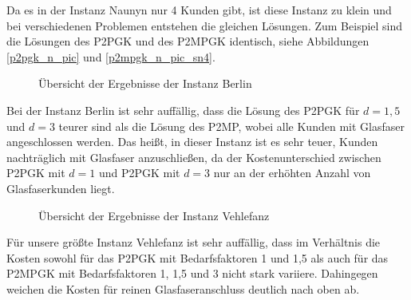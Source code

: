 \documentclass[11pt,a4paper]{article}
\theoremstyle{my_th_style1}
\begin{document}
 Da es in der Instanz Naunyn nur 4 Kunden gibt, ist diese Instanz zu klein und bei verschiedenen Problemen entstehen die gleichen Lösungen. Zum Beispiel sind die Lösungen des P2PGK und des P2MPGK identisch, siehe Abbildungen \eqref{p2pgk_n_pic} und \eqref{p2mpgk_n_pic_sn4}.
 
 \begin{figure}[!htbp]
 	\centering
 	\caption{\"Ubersicht der Ergebnisse der Instanz Berlin}
 \end{figure}
 
 Bei der Instanz Berlin ist sehr auffällig, dass die Lösung des P2PGK für $d=1,5$ und $d=3$ teurer sind als die Lösung des P2MP, wobei alle Kunden mit Glasfaser angeschlossen werden. Das heißt, in dieser Instanz ist es sehr teuer, Kunden nachträglich mit Glasfaser anzuschließen, da der Kostenunterschied zwischen P2PGK mit $d=1$ und P2PGK mit $d=3$ nur an der erhöhten Anzahl von Glasfaserkunden liegt. 
 
 
  \begin{figure}[!htbp]
  	\centering
 	\caption{\"Ubersicht der Ergebnisse der Instanz Vehlefanz}
 \end{figure}
F\"ur unsere gr\"oßte Instanz Vehlefanz ist sehr auff\"allig, dass im Verhältnis die Kosten sowohl f\"ur das P2PGK mit Bedarfsfaktoren 1 und 1,5 als auch f\"ur das P2MPGK mit Bedarfsfaktoren 1, 1,5 und 3 nicht stark variiere.
Dahingegen weichen die Kosten f\"ur reinen Glasfaseranschluss deutlich nach oben ab.
\end{document}
